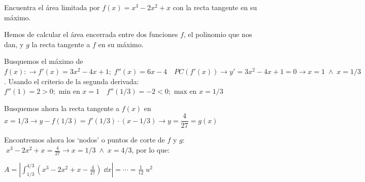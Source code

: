 \begin{ejre}
	Encuentra el área limitada por $f(x)=x^3-2x^2+x$ con la recta tangente en su máximo.
\end{ejre}

\begin{proofw}\renewcommand{\qedsymbol}{$\diamond$}	

Hemos de calcular el área encerrada entre dos funciones $f$, el polinomio que nos dan, y $g$ la recta tangente a $f$ en su máximo.

Busquemos el máximo de $f(x):\to f'(x)=3x^2-4x+1;\; f''(x)=6x-4 \quad PC(f'(x))\to y'=3x^2-4x+1=0 \to x=1 \; \wedge \; x=1/3$. Usando el criterio de la segunda derivada: $f''(1)=2>0 ;  \text { min en }  x=1 \quad f''(1/3)=-2<0 ;\text { max en }  x=1/3	$

Busquemos ahora la recta tangente a $f(x)$ en $x=1/3 \to y-f(1/3)=f'(1/3)\cdot (x-1/3) \to y=\dfrac 4 {27}=g(x)$

Encontremos ahora los `nodos' o puntos de corte de $f$ y $g$: $\; x^3-2x^2+x=\frac 4 {27} \to x=1/3 \; \wedge \; x=4/3$, por lo que:

$A=\displaystyle \left| \int_{1/3}^{4/3} (x^3-2x^2+x-\frac 4 {27})\; \dd x \right|= \cdots = \frac 1 {12} \; u^2 $ 
\end{proofw}

